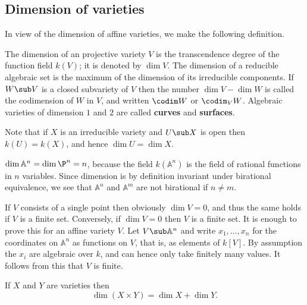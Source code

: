 \subsection{Dimension of varieties}
In view of the dimension of affine varieties, we make the following definition.
\begin{definition}
The dimension of an projective variety $V$ is the transcendence degree of the function field $k(V)$; it is denoted by $\dim V$. The dimension of a reducible algebraic set is the maximum of the dimension of its irreducible components. If $W\sub V$ is a closed subvariety of $V$ then the number $\dim V-\dim W$ is called the codimension of $W$ in $V$, and written $\codim W$ or $\codim_VW$. Algebraic varieties of dimension $1$ and $2$ are called \textbf{curves} and \textbf{surfaces}.
\end{definition}
Note that if $X$ is an irreducible variety and $U\sub X$ is open then $k(U)=k(X)$, and hence $\dim U=\dim X$.
\begin{example}
$\dim\mathbb{A}^n=\dim\P^n=n$, because the field $k(\mathbb{A}^n)$ is the field of rational functions in $n$ variables. Since dimension is by definition invariant under birational equivalence, we see that $\mathbb{A}^n$ and $\mathbb{A}^m$ are not birational if $n\neq m$.
\end{example}
\begin{example}
If $V$ consists of a single point then obviously $\dim V=0$, and thus the same holds if $V$ is a finite set. Conversely, if $\dim V=0$ then $V$ is a finite set. It is enough to prove this for an affine variety $V$. Let $V\sub\mathbb{A}^n$ and write $x_1,\dots,x_n$ for the coordinates on $\mathbb{A}^n$ as functions on $V$, that is, as elements of $k[V]$. By assumption the $x_i$ are algebraic over $k$, and can hence only take finitely many values. It follows from this that $V$ is finite.
\end{example}
\begin{proposition}
If $X$ and $Y$ are varieties then
\[\dim(X\times Y)=\dim X+\dim Y.\]
\end{proposition}
